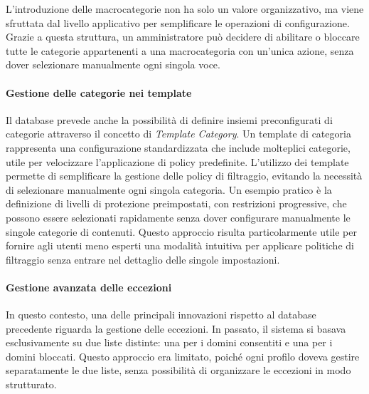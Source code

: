 L'introduzione delle macrocategorie non ha solo un valore organizzativo, ma viene sfruttata dal livello applicativo per semplificare le operazioni di configurazione. Grazie a questa struttura, un amministratore può decidere di abilitare o bloccare tutte le categorie appartenenti a una macrocategoria con un'unica azione, senza dover selezionare manualmente ogni singola voce.

\paragraph{Gestione delle categorie nei template}
Il database prevede anche la possibilità di definire insiemi preconfigurati di categorie attraverso il concetto di \emph{Template Category}. Un template di categoria rappresenta una configurazione standardizzata che include molteplici categorie, utile per velocizzare l’applicazione di policy predefinite.
%
L’utilizzo dei template permette di semplificare la gestione delle policy di filtraggio, evitando la necessità di selezionare manualmente ogni singola categoria. Un esempio pratico è la definizione di livelli di protezione preimpostati, con restrizioni progressive, che possono essere selezionati rapidamente senza dover configurare manualmente le singole categorie di contenuti. Questo approccio risulta particolarmente utile per fornire agli utenti meno esperti una modalità intuitiva per applicare politiche di filtraggio senza entrare nel dettaglio delle singole impostazioni.

\paragraph{Gestione avanzata delle eccezioni}
In questo contesto, una delle principali innovazioni rispetto al database precedente riguarda la gestione delle eccezioni. In passato, il sistema si basava esclusivamente su due liste distinte: una per i domini consentiti e una per i domini bloccati. Questo approccio era limitato, poiché ogni profilo doveva gestire separatamente le due liste, senza possibilità di organizzare le eccezioni in modo strutturato.

